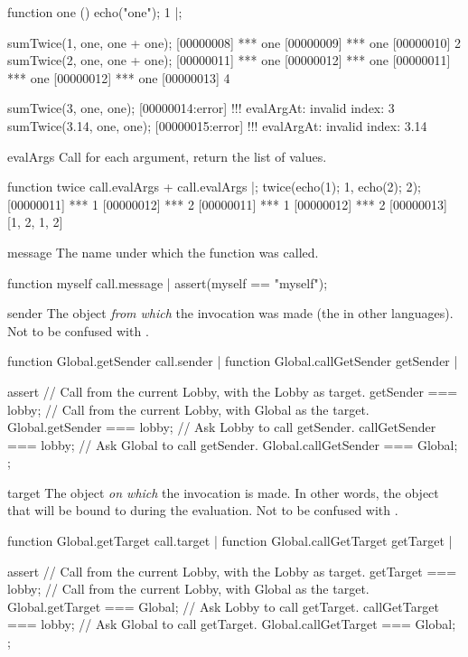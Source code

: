 \begin{urbiscriptapi}
\begin{urbiscript}
function one () { echo("one"); 1 }|;

sumTwice(1, one, one + one);
[00000008] *** one
[00000009] *** one
[00000010] 2
sumTwice(2, one, one + one);
[00000011] *** one
[00000012] *** one
[00000011] *** one
[00000012] *** one
[00000013] 4

sumTwice(3, one, one);
[00000014:error] !!! evalArgAt: invalid index: 3
sumTwice(3.14, one, one);
[00000015:error] !!! evalArgAt: invalid index: 3.14
\end{urbiscript}

\item[evalArgs]%
  Call  for each argument, return the list of values.
\begin{urbiscript}
function twice
{
  call.evalArgs + call.evalArgs
}|;
twice({echo(1); 1}, {echo(2); 2});
[00000011] *** 1
[00000012] *** 2
[00000011] *** 1
[00000012] *** 2
[00000013] [1, 2, 1, 2]
\end{urbiscript}

\item[message]
  The name under which the function was called.
\begin{urbiscript}
function myself { call.message }|
assert(myself == "myself");
\end{urbiscript}

\item[sender]%
  The object \emph{from which} the invocation was made (the  in
  other languages).  Not to be confused with .
\begin{urbiscript}
function Global.getSender { call.sender } |
function Global.callGetSender { getSender } |

assert
{
  // Call from the current Lobby, with the Lobby as target.
  getSender === lobby;
  // Call from the current Lobby, with Global as the target.
  Global.getSender === lobby;
  // Ask Lobby to call getSender.
  callGetSender === lobby;
  // Ask Global to call getSender.
  Global.callGetSender === Global;
};
\end{urbiscript}

\item[target]%
  The object \emph{on which} the invocation is made.  In other words, the
  object that will be bound to \this during the evaluation.  Not to be
  confused with .
\begin{urbiscript}
function Global.getTarget { call.target } |
function Global.callGetTarget { getTarget } |

assert
{
  // Call from the current Lobby, with the Lobby as target.
  getTarget === lobby;
  // Call from the current Lobby, with Global as the target.
  Global.getTarget === Global;
  // Ask Lobby to call getTarget.
  callGetTarget === lobby;
  // Ask Global to call getTarget.
  Global.callGetTarget === Global;
};
\end{urbiscript}

\end{urbiscriptapi}


